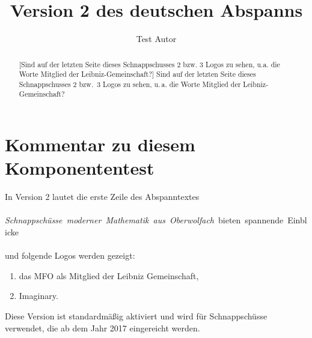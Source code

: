 \documentclass{snapshotmfo}
\author{Test Autor}
\title{Version 2 des deutschen Abspanns}
\begin{document}
\begin{abstract}[Sind auf der letzten Seite dieses Schnappschusses 2 bzw. 3 Logos zu sehen, u.a. die Worte \glqq Mitglied der Leibniz-Gemeinschaft\grqq ?]
Sind auf der letzten Seite dieses Schnappschusses 2 bzw.\ 3 Logos zu sehen, u.\,a. die Worte \glqq Mitglied der Leibniz-Gemeinschaft\grqq ?
\end{abstract}

\section{Kommentar zu diesem Komponententest}
In Version 2 lautet die erste Zeile des Abspanntextes\\
\\
\hbox{\emph{Schnappsch\"usse moderner Mathematik aus Oberwolfach} bieten spannende Einblicke}\\
\\
und folgende Logos werden gezeigt:
\begin{enumerate}
  \item das MFO als Mitglied der Leibniz Gemeinschaft,
  \item Imaginary.
\end{enumerate}
Diese Version ist standardmäßig aktiviert
und wird für Schnappschüsse verwendet, die ab dem Jahr 2017 eingereicht werden.
\end{document}
